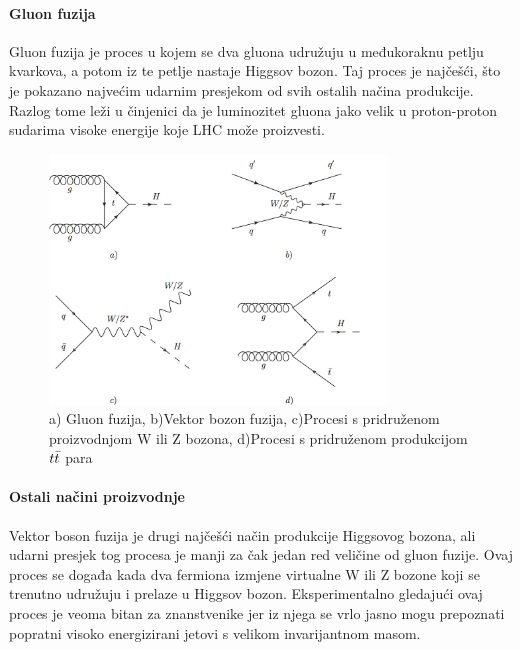 \documentclass[12pt,a4paper,oneside]{article}
\begin{document}
\begin{linenumbers}
		\paragraph{Gluon fuzija\newline}
		Gluon fuzija je proces u kojem se dva gluona udružuju u međukoraknu petlju kvarkova, a potom iz te petlje nastaje Higgsov bozon. Taj proces je najčešći, što je pokazano najvećim udarnim presjekom od svih ostalih načina produkcije. Razlog tome leži u činjenici da je luminozitet gluona jako velik u proton-proton sudarima visoke energije koje LHC može proizvesti.
		\begin{figure}[h!]
			\centering
			\includegraphics[width=0.8\textwidth]{higgs-production.jpg}
			\caption[Saturn viđen u  svjetlu.]{\label{sl:gluon-fuzija}a) Gluon fuzija, b)Vektor bozon fuzija, c)Procesi s pridruženom proizvodnjom W ili Z bozona, d)Procesi s pridruženom produkcijom \begin{math}
				\boldmath{t \bar{t}}
				\end{math}  para  }
		\end{figure}
		
		\paragraph{Ostali načini proizvodnje\newline}
		Vektor boson fuzija je drugi najčešći način produkcije Higgsovog bozona, ali udarni presjek tog procesa je manji za čak jedan red veličine od gluon fuzije. Ovaj proces se događa kada dva fermiona izmjene virtualne W ili Z bozone koji se trenutno udružuju i prelaze u Higgsov bozon. Eksperimentalno gledajući ovaj proces je veoma bitan za znanstvenike jer iz njega se vrlo jasno mogu prepoznati popratni visoko energizirani jetovi s velikom invarijantnom masom.
	

\end{linenumbers}
\end{document}
